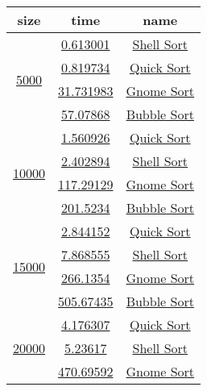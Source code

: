 %

\newsavebox{\sorttime}
\begin{lrbox}{\sorttime}
\begin{tabular}{|c|c|c|}
\hline
\textbf{size} & \textbf{time} & \textbf{name}\\
\hline\hline
 \multirow{4}{*}{\href{T1.3.0}{5000}} & {\href{T1.1.1}{0.613001}} & {\href{T1.1.2}{Shell Sort}}\\
\cline{2-3}
 & {\href{T1.0.1}{0.819734}} & {\href{T1.0.2}{Quick Sort}}\\
\cline{2-3}
 & {\href{T1.3.1}{31.731983}} & {\href{T1.3.2}{Gnome Sort}}\\
\cline{2-3}
 & {\href{T1.2.1}{57.07868}} & {\href{T1.2.2}{Bubble Sort}}\\
\hline
 \multirow{4}{*}{\href{T1.5.0}{10000}} & {\href{T1.4.1}{1.560926}} & {\href{T1.4.2}{Quick Sort}}\\
\cline{2-3}
 & {\href{T1.5.1}{2.402894}} & {\href{T1.5.2}{Shell Sort}}\\
\cline{2-3}
 & {\href{T1.7.1}{117.29129}} & {\href{T1.7.2}{Gnome Sort}}\\
\cline{2-3}
 & {\href{T1.6.1}{201.5234}} & {\href{T1.6.2}{Bubble Sort}}\\
\hline
 \multirow{4}{*}{\href{T1.8.0}{15000}} & {\href{T1.8.1}{2.844152}} & {\href{T1.8.2}{Quick Sort}}\\
\cline{2-3}
 & {\href{T1.9.1}{7.868555}} & {\href{T1.9.2}{Shell Sort}}\\
\cline{2-3}
 & {\href{T1.11.1}{266.1354}} & {\href{T1.11.2}{Gnome Sort}}\\
\cline{2-3}
 & {\href{T1.10.1}{505.67435}} & {\href{T1.10.2}{Bubble Sort}}\\
\hline
 \multirow{4}{*}{\href{T1.13.0}{20000}} & {\href{T1.12.1}{4.176307}} & {\href{T1.12.2}{Quick Sort}}\\
\cline{2-3}
 & {\href{T1.13.1}{5.23617}} & {\href{T1.13.2}{Shell Sort}}\\
\cline{2-3}
 & {\href{T1.15.1}{470.69592}} & {\href{T1.15.2}{Gnome Sort}}\\

\end{tabular}
\end{lrbox}

